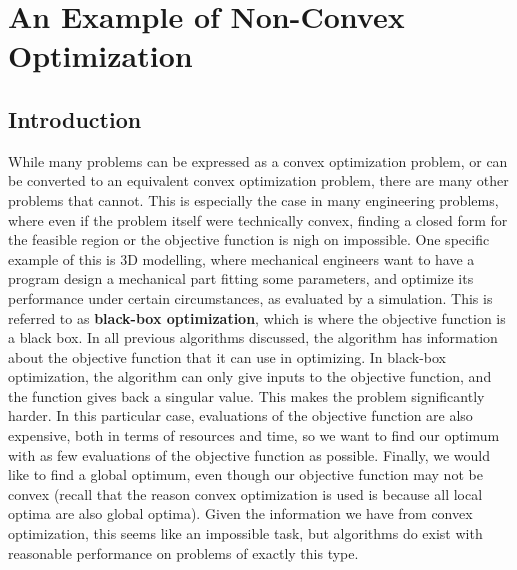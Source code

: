 \documentclass[10pt]{article}
\begin{document}
\section{An Example of Non-Convex Optimization}
\subsection{Introduction}
	While many problems can be expressed as a convex optimization problem, or can be converted to an equivalent convex optimization problem, there are many other problems that cannot. This is especially the case in many engineering problems, where even if the problem itself were technically convex, finding a closed form for the feasible region or the objective function is nigh on impossible. One specific example of this is 3D modelling, where mechanical engineers want to have a program design a mechanical part fitting some parameters, and optimize its performance under certain circumstances, as evaluated by a simulation. This is referred to as \textbf{black-box optimization}, which is where the objective function is a black box. In all previous algorithms discussed, the algorithm has information about the objective function that it can use in optimizing. In black-box optimization, the algorithm can only give inputs to the objective function, and the function gives back a singular value. This makes the problem significantly harder. In this particular case, evaluations of the objective function are also expensive, both in terms of resources and time, so we want to find our optimum with as few evaluations of the objective function as possible. Finally, we would like to find a global optimum, even though our objective function may not be convex (recall that the reason convex optimization is used is because all local optima are also global optima). Given the information we have from convex optimization, this seems like an impossible task, but algorithms do exist with reasonable performance on problems of exactly this type.
\end{document}
